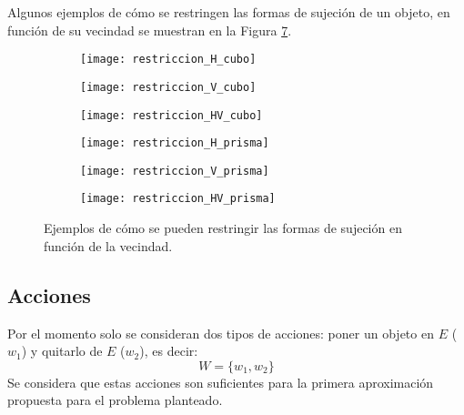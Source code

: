 Algunos ejemplos de cómo se restringen las formas de sujeción de un objeto, en función de su vecindad se muestran en la Figura \ref{fig:restricciones_agarre}.
%
\begin{figure}[H]
	\def\hsep{12pt}%
	\captionsetup[subfigure]{width=\textwidth}%
	\begin{subfigure}{0.31\textwidth}
		\texttt{[image: restriccion\_H\_cubo]}%
		\label{subfig:restriccion_H_cubo}%
	\end{subfigure}%
	\hspace{\hsep}%
	\begin{subfigure}{0.31\textwidth}
		\texttt{[image: restriccion\_V\_cubo]}%
		\label{subfig:restriccion_V_cubo}%
	\end{subfigure}%
	\hspace{\hsep}%
	\begin{subfigure}{0.31\textwidth}
		\texttt{[image: restriccion\_HV\_cubo]}%
		\label{subfig:restriccion_HV_cubo}%
	\end{subfigure}%
	
	\vspace{0.7cm}
	\begin{subfigure}{0.31\textwidth} 
		\texttt{[image: restriccion\_H\_prisma]}%
		\label{subfig:restriccion_H_prisma}
	\end{subfigure}%
	\hspace{\hsep}%
	\begin{subfigure}{0.31\textwidth}
		\texttt{[image: restriccion\_V\_prisma]}%
		\label{subfig:restriccion_V_prisma}
	\end{subfigure}%
	\hspace{\hsep}%
	\begin{subfigure}{0.31\textwidth}
		\texttt{[image: restriccion\_HV\_prisma]}%
		\label{subfig:restriccion_HV_prisma}%
	\end{subfigure}%
	\caption{Ejemplos de cómo se pueden restringir las formas de sujeción en función de la vecindad.}%
	\label{fig:restricciones_agarre}%
\end{figure}
%
%
\subsection{Acciones}
\label{subsec:acciones}
%
%	
Por el momento solo se consideran dos tipos de acciones: poner un objeto en $E$ ($w_1$) y quitarlo de $E$ ($w_2$), es decir:
%
\begin{equation}
	\label{eq:acciones_usadas}
	W = \{w_1, w_2\}
\end{equation}
%
Se considera que estas acciones son suficientes para la primera aproximación propuesta para el problema planteado. 
%
%
